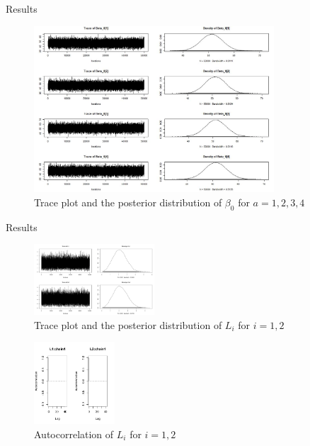 \documentclass[10pt]{beamer} %
\begin{document}
\begin{frame}{Results}
    \begin{figure}[H]
    \centering
    \includegraphics[width=0.8\textwidth]{Beta_a01.JPG}
    \caption{Trace plot and the posterior distribution of $\beta_0$ for $a=1,2,3,4$}
    \label{betaa0}
\end{figure}
\end{frame}

\begin{frame}{Results}
    \begin{figure}[H]
    \centering
    \includegraphics[width=0.4\textwidth ]{L_trace.png}
    \caption{Trace plot and the posterior distribution of $L_i$ for $i=1,2$}
    \label{L_i}
\end{figure}

\begin{figure}[H]
    \centering
    \includegraphics[width=0.27\textwidth ]{Auto_cor_L.png}
    \caption{Autocorrelation of $L_i$ for $i=1,2$}
    \label{autocorL}
\end{figure}
\end{frame}
\end{document}
